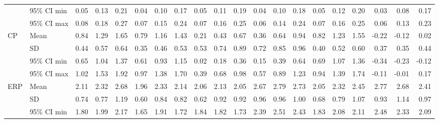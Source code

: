 \begin{longtable}{llrrrrrrrrrrrrrrrrrr}
   & 95\% CI min &       0.05 &       0.13 &       0.21 &       0.04 &       0.10 &       0.17 &       0.05 &       0.11 &       0.19 &       0.04 &       0.10 &       0.18 &       0.05 &       0.12 &       0.20 &       0.03 &       0.08 &       0.17 \\
   & 95\% CI max &       0.08 &       0.18 &       0.27 &       0.07 &       0.15 &       0.24 &       0.07 &       0.16 &       0.25 &       0.06 &       0.14 &       0.24 &       0.07 &       0.16 &       0.25 &       0.06 &       0.13 &       0.23 \\
\cline{1-20}
\multirow{4}{*}{CP} & Mean &       0.84 &       1.29 &       1.65 &       0.79 &       1.16 &       1.43 &       0.21 &       0.43 &       0.67 &       0.36 &       0.64 &       0.94 &       0.82 &       1.23 &       1.55 &      -0.22 &      -0.12 &       0.02 \\
   & SD &       0.44 &       0.57 &       0.64 &       0.35 &       0.46 &       0.53 &       0.53 &       0.74 &       0.89 &       0.72 &       0.85 &       0.96 &       0.40 &       0.52 &       0.60 &       0.37 &       0.35 &       0.44 \\
   & 95\% CI min &       0.65 &       1.04 &       1.37 &       0.61 &       0.93 &       1.15 &       0.02 &       0.18 &       0.36 &       0.15 &       0.39 &       0.64 &       0.69 &       1.07 &       1.36 &      -0.34 &      -0.23 &      -0.12 \\
   & 95\% CI max &       1.02 &       1.53 &       1.92 &       0.97 &       1.38 &       1.70 &       0.39 &       0.68 &       0.98 &       0.57 &       0.89 &       1.23 &       0.94 &       1.39 &       1.74 &      -0.11 &      -0.01 &       0.17 \\
\cline{1-20}
\multirow{4}{*}{ERP} & Mean &       2.11 &       2.32 &       2.68 &       1.96 &       2.33 &       2.14 &       2.06 &       2.13 &       2.05 &       2.67 &       2.79 &       2.73 &       2.05 &       2.32 &       2.45 &       2.77 &       2.68 &       2.41 \\
   & SD &       0.74 &       0.77 &       1.19 &       0.60 &       0.84 &       0.82 &       0.62 &       0.92 &       0.92 &       0.96 &       0.96 &       1.00 &       0.68 &       0.79 &       1.07 &       0.93 &       1.14 &       0.97 \\
   & 95\% CI min &       1.80 &       1.99 &       2.17 &       1.65 &       1.91 &       1.72 &       1.84 &       1.82 &       1.73 &       2.39 &       2.51 &       2.43 &       1.83 &       2.08 &       2.11 &       2.48 &       2.33 &       2.09 \\

\end{longtable}
